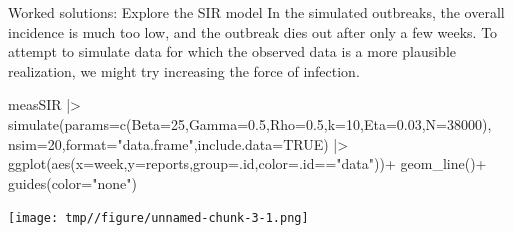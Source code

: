 \documentclass[
  ignorenonframetext,
  aspectratio=169,
  t]{beamer}
\newenvironment{Shaded}{\begin{snugshade}}{\end{snugshade}}
\newcommand{\AttributeTok}[1]{\textcolor[rgb]{0.40,0.45,0.13}{#1}}
\newcommand{\ConstantTok}[1]{\textcolor[rgb]{0.56,0.35,0.01}{#1}}
\newcommand{\DecValTok}[1]{\textcolor[rgb]{0.68,0.00,0.00}{#1}}
\newcommand{\FloatTok}[1]{\textcolor[rgb]{0.68,0.00,0.00}{#1}}
\newcommand{\FunctionTok}[1]{\textcolor[rgb]{0.28,0.35,0.67}{#1}}
\newcommand{\NormalTok}[1]{\textcolor[rgb]{0.00,0.23,0.31}{#1}}
\newcommand{\SpecialCharTok}[1]{\textcolor[rgb]{0.37,0.37,0.37}{#1}}
\newcommand{\StringTok}[1]{\textcolor[rgb]{0.13,0.47,0.30}{#1}}
\theoremstyle{definition}
\begin{document}
\begin{frame}{Worked solutions: Explore the
SIR model}
\label{worked-solutions-explore-the-sir-model}
In the simulated outbreaks, the overall incidence is much too low, and
the outbreak dies out after only a few weeks. To attempt to simulate
data for which the observed data is a more plausible realization, we
might try increasing the force of infection.

\begin{Shaded}
\begin{Highlighting}[]
\NormalTok{measSIR }\SpecialCharTok{|\textgreater{}}
  \FunctionTok{simulate}\NormalTok{(}\AttributeTok{params=}\FunctionTok{c}\NormalTok{(}\AttributeTok{Beta=}\DecValTok{25}\NormalTok{,}\AttributeTok{Gamma=}\FloatTok{0.5}\NormalTok{,}\AttributeTok{Rho=}\FloatTok{0.5}\NormalTok{,}\AttributeTok{k=}\DecValTok{10}\NormalTok{,}\AttributeTok{Eta=}\FloatTok{0.03}\NormalTok{,}\AttributeTok{N=}\DecValTok{38000}\NormalTok{),}
    \AttributeTok{nsim=}\DecValTok{20}\NormalTok{,}\AttributeTok{format=}\StringTok{"data.frame"}\NormalTok{,}\AttributeTok{include.data=}\ConstantTok{TRUE}\NormalTok{) }\SpecialCharTok{|\textgreater{}}
  \FunctionTok{ggplot}\NormalTok{(}\FunctionTok{aes}\NormalTok{(}\AttributeTok{x=}\NormalTok{week,}\AttributeTok{y=}\NormalTok{reports,}\AttributeTok{group=}\NormalTok{.id,}\AttributeTok{color=}\NormalTok{.id}\SpecialCharTok{==}\StringTok{"data"}\NormalTok{))}\SpecialCharTok{+}
  \FunctionTok{geom\_line}\NormalTok{()}\SpecialCharTok{+}
  \FunctionTok{guides}\NormalTok{(}\AttributeTok{color=}\StringTok{"none"}\NormalTok{)}
\end{Highlighting}
\end{Shaded}

\begin{center}
\texttt{[image: tmp//figure/unnamed-chunk-3-1.png]}
\end{center}
\end{frame}
\end{document}
